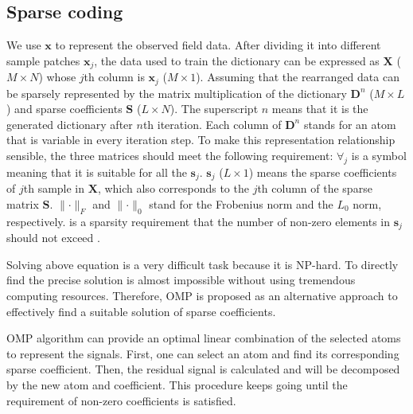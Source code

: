 \subsection{Sparse coding}
We use $\mathbf{x}$ to represent the observed field data. After dividing it into different sample patches $\mathbf{x}_j$, the data used to train the dictionary can be expressed as $\mathbf{X}$ ($M\times N$) whose $j$th column is $\mathbf{x}_j$ ($M\times 1$). Assuming that the rearranged data can be sparsely represented by the matrix multiplication of the dictionary $\mathbf{D}^{n}$ ($M\times L$) and sparse coefficients $\mathbf{S}$ ($L\times N$). The superscript $n$ means that it is the generated dictionary after $n$th iteration. Each column of $\mathbf{D}^{n}$ stands for an atom that is variable in every iteration step. To make this representation relationship sensible, the three matrices should meet the following requirement:
$\forall_{j}$ is a symbol meaning that it is suitable for all the $\mathbf{s}_j$. $\mathbf{s}_j$ ($L\times 1$) means the sparse coefficients of $j$th sample in $\mathbf{X}$, which also corresponds to the $j$th column of the sparse matrix $\mathbf{S}$.  $\parallel \cdot \parallel_{F}$ and $\parallel \cdot \parallel_{0}$ stand for the Frobenius norm and the $L_0$ norm, respectively.  is a sparsity requirement that the number of non-zero elements in $\mathbf{s}_j$ should not exceed .

Solving above equation is a very difficult task because it is NP-hard. To directly find the precise solution is almost impossible without using tremendous computing resources. Therefore, OMP is proposed as an alternative approach to effectively find a suitable solution of sparse coefficients.

OMP algorithm can provide an optimal linear combination of the selected atoms to represent the signals. First, one can select an atom and find its corresponding sparse coefficient. Then, the residual signal is calculated and will be decomposed by the new atom and coefficient. This procedure keeps going until the requirement of  non-zero coefficients is satisfied. 

